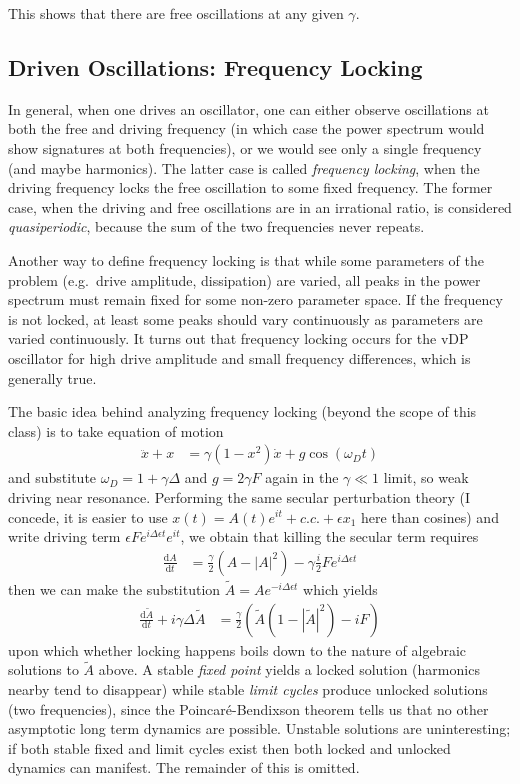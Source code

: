 \documentclass[10pt]{article}
\newcommand{\rd}[2]{\frac{\mathrm{d}#1}{\mathrm{d}#2}}
\newcommand{\abs}[1]{\left|#1\right|}
\begin{document}
This shows that there are free oscillations at any given $\gamma$.

\subsection{Driven Oscillations: Frequency Locking}

In general, when one drives an oscillator, one can either observe oscillations at both the free and driving frequency (in which case the power spectrum would show signatures at both frequencies), or we would see only a single frequency (and maybe harmonics). The latter case is called \emph{frequency locking}, when the driving frequency locks the free oscillation to some fixed frequency. The former case, when the driving and free oscillations are in an irrational ratio, is considered \emph{quasiperiodic}, because the sum of the two frequencies never repeats.

Another way to define frequency locking is that while some parameters of the problem (e.g.\ drive amplitude, dissipation) are varied, all peaks in the power spectrum must remain fixed for some non-zero parameter space. If the frequency is not locked, at least some peaks should vary continuously as parameters are varied continuously. It turns out that frequency locking occurs for the vDP oscillator for high drive amplitude and small frequency differences, which is generally true.

The basic idea behind analyzing frequency locking (beyond the scope of this class) is to take equation of motion
\begin{align}
    \ddot{x} + x &= \gamma(1-x^2)\dot{x} + g\cos(\omega_D t)
\end{align}
and substitute $\omega_D = 1 + \gamma \Delta$ and $g = 2\gamma F$ again in the $\gamma \ll 1$ limit, so weak driving near resonance. Performing the same secular perturbation theory (I concede, it is easier to use $x(t) = A(t)e^{it} + c.c. + \epsilon x_1$ here than cosines) and write driving term $\epsilon F e^{i \Delta \epsilon t}e^{it}$, we obtain that killing the secular term requires
\begin{align}
    \rd{A}{t} &= \frac{\gamma}{2}\left( A - \abs{A}^2 \right) - \gamma\frac{i}{2}Fe^{i\Delta \epsilon t}
\end{align}
then we can make the substitution $\tilde{A} = Ae^{-i\Delta \epsilon t}$ which yields
\begin{align}
    \rd{\tilde{A}}{t} + i\gamma \Delta \tilde{A} &= \frac{\gamma}{2}\left( \tilde{A}(1-\abs{\tilde{A}}^2) - iF \right)
\end{align}
upon which whether locking happens boils down to the nature of algebraic solutions to $\tilde{A}$ above. A stable \emph{fixed point} yields a locked solution (harmonics nearby tend to disappear) while stable \emph{limit cycles} produce unlocked solutions (two frequencies), since the Poincar\'e-Bendixson theorem tells us that no other asymptotic long term dynamics are possible. Unstable solutions are uninteresting; if both stable fixed and limit cycles exist then both locked and unlocked dynamics can manifest. The remainder of this is omitted.
\end{document}

